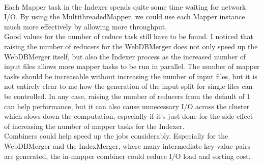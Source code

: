 \documentclass[12pt,a4paper]{report}
\begin{document}
\\
Each Mapper task in the Indexer spends quite some time waiting for network I/O. By using the MultithreadedMapper, we could use each Mapper instance much more effectively by allowing more throughput.
\\
Good values for the number of reduce task still have to be found. I noticed that raising the number of reducers for the WebDBMerger does not only speed up the WebDBMerger itself,
but also the Indexer process as the increased number of input files allows more mapper tasks to be run in parallel. The number of mapper tasks should be increasable without increasing the number of input files, but it is not entirely clear to me how the generation of the input split for single files can be controlled. In any case, raising the number of reducers from the default of 1 can help performance, but it can also cause unnecessary I/O across the cluster which slows down the computation, especially if it's just done for the side effect of increasing the number of mapper tasks for the Indexer.
\\
Combiners could help speed up the jobs considerably. Especially for the WebDBMerger and the IndexMerger, where many intermediate key-value pairs are generated, the in-mapper combiner could reduce I/O load and sorting cost.
\end{document}
